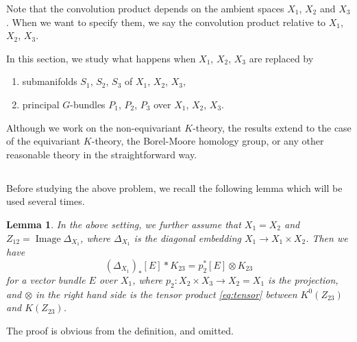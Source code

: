 \documentclass[12pt]{amsart}
\renewcommand{\labelenumi}{(\theenumi)}%
\newenvironment{aenume}{%
  \begin{enumerate}%
  \renewcommand{\theenumi}{\alph{enumi}}%
  \renewcommand{\labelenumi}{(\theenumi)}%
  }{\end{enumerate}}
\newtheorem{Lemma}[equation]{Lemma}
\theoremstyle{definition}
\theoremstyle{remark}
\numberwithin{equation}{subsection}
\begin{document}
Note that the convolution product depends on the ambient spaces $X_1$, 
$X_2$ and $X_3$. When we want to specify them, we say the convolution
product relative to $X_1$, $X_2$, $X_3$.

In this section, we study what happens when
$X_1$, $X_2$, $X_3$ are replaced by 
\begin{aenume}
\item submanifolds $S_1$, $S_2$, $S_3$ of $X_1$, $X_2$, $X_3$,
\item principal $G$-bundles $P_1$, $P_2$, $P_3$ over $X_1$, $X_2$, $X_3$.
\end{aenume}

Although we work on the non-equivariant $K$-theory, the results
extend to the case of the equivariant $K$-theory, the Borel-Moore
homology group, or any other reasonable theory in the straightforward way.

\subsection{}
Before studying the above problem, we recall the following lemma which 
will be used several times.
\begin{Lemma}\label{lem:diag}
In the above setting, we further assume that $X_1 = X_2$ and 
$Z_{12} = \operatorname{Image}\Delta_{X_1}$, where $\Delta_{X_1}$ is the
diagonal embedding $X_1\to X_1\times X_2$. Then we have
\begin{equation*}
   (\Delta_{X_1})_*[E] * K_{23} = p_2^* [E]
  \otimes K_{23}
\end{equation*}
for a vector bundle $E$ over $X_1$, where 
$p_2\colon X_2\times X_3\to X_2 = X_1$ is the projection, and
$\otimes$ in the right hand side is the tensor product
\eqref{eq:tensor} between $K^0(Z_{23})$ and $K(Z_{23})$.
\end{Lemma}

The proof is obvious from the definition, and omitted.
\end{document}
